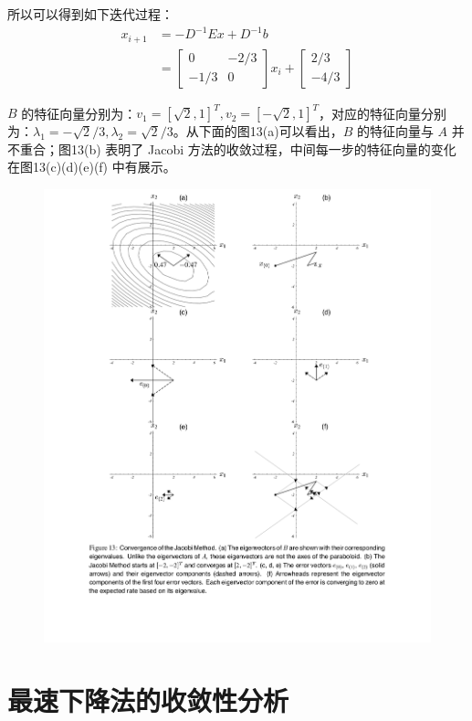 \documentclass[12pt]{article}
\begin{document}
所以可以得到如下迭代过程：
\begin{align*}
x_{i+1} &= -D^{-1}Ex + D^{-1}b \\
          &= \begin{bmatrix} 0 & -2/3 \\ -1/3 & 0\end{bmatrix}x_i + \begin{bmatrix} 2/3 \\ -4/3\end{bmatrix}
\end{align*}

$B$ 的特征向量分别为：$v_1 = [\sqrt{2}, 1]^T, v_2 = [-\sqrt{2}, 1]^T$，对应的特征向量分别为：$\lambda_1 = -\sqrt{2}/3, \lambda_2 = \sqrt{2}/3$。从下面的图13(a)可以看出，$B$ 的特征向量与 $A$ 并不重合；图13(b) 表明了 Jacobi 方法的收敛过程，中间每一步的特征向量的变化在图13(c)(d)(e)(f) 中有展示。
\begin{figure}[H]
    \centering
    \includegraphics[width=1\textwidth]{fig/CG_Convergence_Jacobi_1.png}
\end{figure}

\section{最速下降法的收敛性分析}
\end{document}
